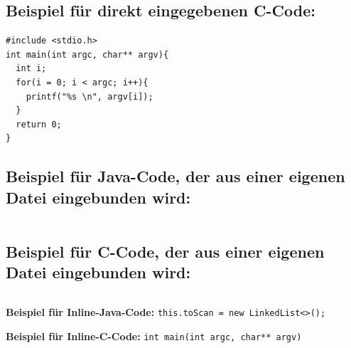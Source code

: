 \subsection*{Beispiel für direkt eingegebenen C-Code:}
\begin{verbatim}
#include <stdio.h>
int main(int argc, char** argv){
  int i;
  for(i = 0; i < argc; i++){
    printf("%s \n", argv[i]);
  }
  return 0;
}
\end{verbatim}

\subsection*{Beispiel für Java-Code, der aus einer eigenen Datei eingebunden wird:}

\inputminted{java}{programm.java}

\subsection*{Beispiel für C-Code, der aus einer eigenen Datei eingebunden wird:}

\inputminted{c}{programm.c}



\textbf{Beispiel für Inline-Java-Code:} \texttt{this.toScan = new LinkedList<>();}

\textbf{Beispiel für Inline-C-Code:} \texttt{int main(int argc, char** argv)}



